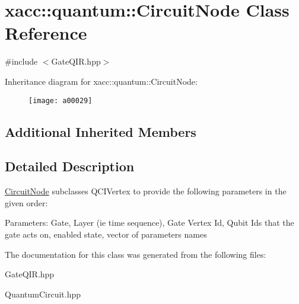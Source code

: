 \hypertarget{a00029}{}\section{xacc\+:\+:quantum\+:\+:Circuit\+Node Class Reference}
\label{a00029}


{\ttfamily \#include $<$Gate\+Q\+I\+R.\+hpp$>$}

Inheritance diagram for xacc\+:\+:quantum\+:\+:Circuit\+Node\+:\begin{figure}[H]
\begin{center}
\leavevmode
\texttt{[image: a00029]}
\end{center}
\end{figure}
\subsection*{Additional Inherited Members}


\subsection{Detailed Description}
\hyperlink{a00029}{Circuit\+Node} subclasses Q\+C\+I\+Vertex to provide the following parameters in the given order\+:

Parameters\+: Gate, Layer (ie time sequence), Gate Vertex Id, Qubit Ids that the gate acts on, enabled state, vector of parameters names 

The documentation for this class was generated from the following files\+:\begin{DoxyCompactItemize}
\item 
Gate\+Q\+I\+R.\+hpp\item 
Quantum\+Circuit.\+hpp\end{DoxyCompactItemize}
